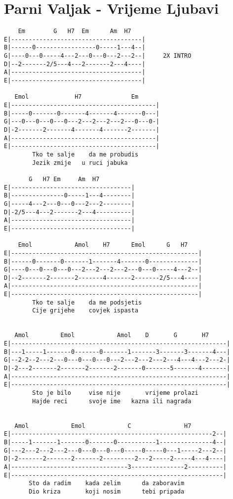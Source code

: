 \section{Parni Valjak - Vrijeme Ljubavi}
\begin{verbatim}
    Em        G   H7  Em      Am  H7
E|-------------------------------------|
B|------0-----------------0-----1---4--|
G|----0---0-----4---2---0---0---2---2--|     2X INTRO
D|--2-------2/5---4---2-------2---4----|
A|-------------------------------------|
E|-------------------------------------|

   Emol             H7              Em
E|-----------------------------------------|
B|-----0-------0-------4-------4-------0---|
G|---0---0---0---0---2---2---2---2---0---0-|
D|-2-------2-------4-------4-------2-------|
A|-----------------------------------------|
E|-----------------------------------------|
        Tko te salje    da me probudis
        Jezik zmije   u ruci jabuka

       G   H7 Em     Am  H7
E|----------------------------------|
B|---------------0-----1---4--------|
G|-----4---2---0---0---2---2--------|
D|-2/5---4---2-------2---4----------|
A|----------------------------------|
E|----------------------------------|

    Emol            Amol    H7      Emol      G   H7  
E|-----------------------------------------------------|
B|------0-------0-------1-------4-------0--------------|
G|----0---0---0---0---2---2---2---2---0---0-----4---2--|
D|--2-------2-------2-------4-------2-------2/5---4----|
A|-----------------------------------------------------|
E|-----------------------------------------------------|
        Tko te salje    da me podsjetis
        Cije grijehe    covjek ispasta


   Amol         Emol            Amol    D       G       H7   
E|-------------------------------------------------------------|
B|---1-----1-------0-------0-------1-------3-------3-------4---|
G|--2-2--2---2---0---0---0---0---2---2---2---2---4---4---2---2-|
D|-2---2-------2-------2-------2-------0-------5-------4-------|
A|-------------------------------------------------------------|
E|-------------------------------------------------------------|
        Sto je bilo     vise nije       vrijeme prolazi
        Hajde reci      svoje ime   kazna ili nagrada


   Amol            Emol            C               H7          
E|---------------------------------------------------------2--|
B|-----1-------1-------0-------0-----------1---------------4--|
G|---2---2---2---2---0---0---0---0-----0-----0---1-----2---2--|
D|-2-------2-------2-------2---------2---2-----2-----4---4----|
A|---------------------------------3---------------2----------|
E|------------------------------------------------------------|
       Sto da radim    kada zelim      da zaboravim
       Dio kriza       koji nosim      tebi pripada



\end{verbatim}
